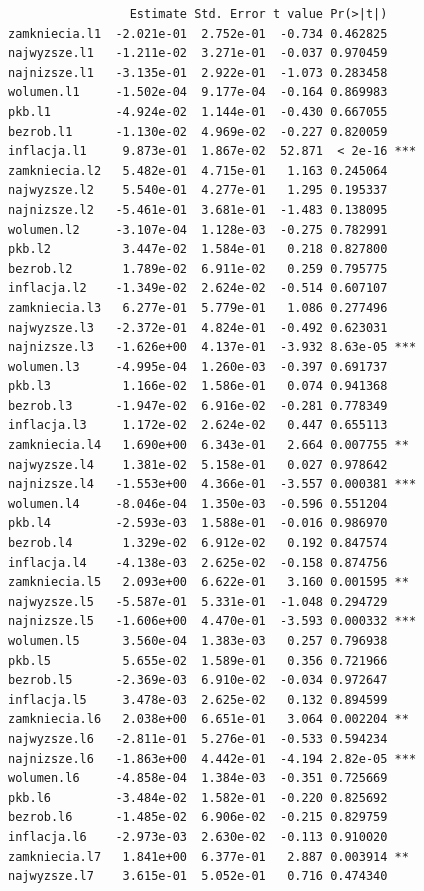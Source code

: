 \documentclass[
  polish,
  letterpaper,
  DIV=11,
  numbers=noendperiod]{scrartcl}
\begin{document}
\begin{verbatim}
                 Estimate Std. Error t value Pr(>|t|)    
zamkniecia.l1  -2.021e-01  2.752e-01  -0.734 0.462825    
najwyzsze.l1   -1.211e-02  3.271e-01  -0.037 0.970459    
najnizsze.l1   -3.135e-01  2.922e-01  -1.073 0.283458    
wolumen.l1     -1.502e-04  9.177e-04  -0.164 0.869983    
pkb.l1         -4.924e-02  1.144e-01  -0.430 0.667055    
bezrob.l1      -1.130e-02  4.969e-02  -0.227 0.820059    
inflacja.l1     9.873e-01  1.867e-02  52.871  < 2e-16 ***
zamkniecia.l2   5.482e-01  4.715e-01   1.163 0.245064    
najwyzsze.l2    5.540e-01  4.277e-01   1.295 0.195337    
najnizsze.l2   -5.461e-01  3.681e-01  -1.483 0.138095    
wolumen.l2     -3.107e-04  1.128e-03  -0.275 0.782991    
pkb.l2          3.447e-02  1.584e-01   0.218 0.827800    
bezrob.l2       1.789e-02  6.911e-02   0.259 0.795775    
inflacja.l2    -1.349e-02  2.624e-02  -0.514 0.607107    
zamkniecia.l3   6.277e-01  5.779e-01   1.086 0.277496    
najwyzsze.l3   -2.372e-01  4.824e-01  -0.492 0.623031    
najnizsze.l3   -1.626e+00  4.137e-01  -3.932 8.63e-05 ***
wolumen.l3     -4.995e-04  1.260e-03  -0.397 0.691737    
pkb.l3          1.166e-02  1.586e-01   0.074 0.941368    
bezrob.l3      -1.947e-02  6.916e-02  -0.281 0.778349    
inflacja.l3     1.172e-02  2.624e-02   0.447 0.655113    
zamkniecia.l4   1.690e+00  6.343e-01   2.664 0.007755 ** 
najwyzsze.l4    1.381e-02  5.158e-01   0.027 0.978642    
najnizsze.l4   -1.553e+00  4.366e-01  -3.557 0.000381 ***
wolumen.l4     -8.046e-04  1.350e-03  -0.596 0.551204    
pkb.l4         -2.593e-03  1.588e-01  -0.016 0.986970    
bezrob.l4       1.329e-02  6.912e-02   0.192 0.847574    
inflacja.l4    -4.138e-03  2.625e-02  -0.158 0.874756    
zamkniecia.l5   2.093e+00  6.622e-01   3.160 0.001595 ** 
najwyzsze.l5   -5.587e-01  5.331e-01  -1.048 0.294729    
najnizsze.l5   -1.606e+00  4.470e-01  -3.593 0.000332 ***
wolumen.l5      3.560e-04  1.383e-03   0.257 0.796938    
pkb.l5          5.655e-02  1.589e-01   0.356 0.721966    
bezrob.l5      -2.369e-03  6.910e-02  -0.034 0.972647    
inflacja.l5     3.478e-03  2.625e-02   0.132 0.894599    
zamkniecia.l6   2.038e+00  6.651e-01   3.064 0.002204 ** 
najwyzsze.l6   -2.811e-01  5.276e-01  -0.533 0.594234    
najnizsze.l6   -1.863e+00  4.442e-01  -4.194 2.82e-05 ***
wolumen.l6     -4.858e-04  1.384e-03  -0.351 0.725669    
pkb.l6         -3.484e-02  1.582e-01  -0.220 0.825692    
bezrob.l6      -1.485e-02  6.906e-02  -0.215 0.829759    
inflacja.l6    -2.973e-03  2.630e-02  -0.113 0.910020    
zamkniecia.l7   1.841e+00  6.377e-01   2.887 0.003914 ** 
najwyzsze.l7    3.615e-01  5.052e-01   0.716 0.474340    

\end{verbatim}
\end{document}
